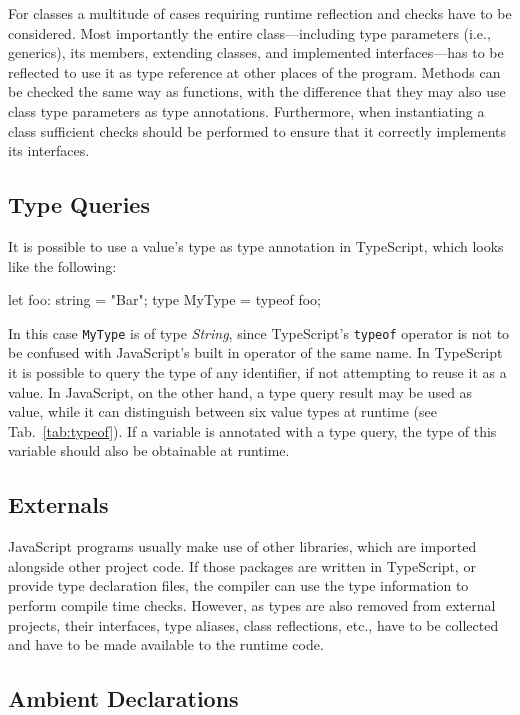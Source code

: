 For classes a multitude of cases requiring runtime reflection and checks have to be considered. Most importantly the entire class---including type parameters (i.e., generics), its members, extending classes, and implemented interfaces---has to be reflected to use it as type reference at other places of the program. Methods can be checked the same way as functions, with the difference that they may also use class type parameters as type annotations. Furthermore, when instantiating a class sufficient checks should be performed to ensure that it correctly implements its interfaces.


\subsection{Type Queries}

It is possible to use a value's type as type annotation in TypeScript, which looks like the following:
\begin{JsCode}[numbers=none]
let foo: string = "Bar";
type MyType = typeof foo;
\end{JsCode}
In this case \texttt{MyType} is of type \emph{String}, since TypeScript's \texttt{typeof} operator is not to be confused with JavaScript's built in operator of the same name. In TypeScript it is possible to query the type of any identifier, if not attempting to reuse it as a value. In JavaScript, on the other hand, a type query result may be used as value, while it can distinguish between six value types at runtime (see Tab.~\ref{tab:typeof}). If a variable is annotated with a type query, the type of this variable should also be obtainable at runtime.

\subsection{Externals}

JavaScript programs usually make use of other libraries, which are imported alongside 
other project code. If those packages are written in TypeScript, or provide type declaration files, the compiler can use the type information to perform compile time checks. However, as types are also removed from external projects, their interfaces, type aliases, class reflections, etc., have to be collected and have to be made available to the runtime code.

\subsection{Ambient Declarations}

